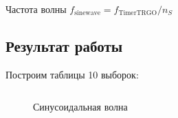 \documentclass[12pt]{article} %
\begin{document}
Частота волны $f_\text{sinewave} = f_\text{TimerTRGO}/n_S$


\subsection{Результат работы}
Построим таблицы 10 выборок: 
\inputminted[firstline=38, lastline=38,breaklines]{C}{F:/git/micro/Lab5/DACWave.c}

\begin{figure}[H]
	\begin{subfigure}
		\texttt{[image: F:/git/micro/Lab5/report/sineanalog2.png]}	
	\end{subfigure}
	\hfill
	\begin{subfigure}
		\texttt{[image: F:/git/micro/Lab5/report/FFT.png]}	
	\end{subfigure}
	\caption{Синусоидальная волна}
\end{figure}
\end{document}

